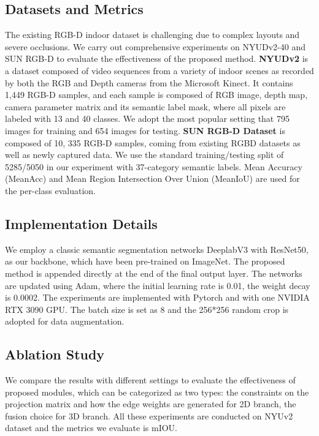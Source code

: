 \documentclass[journal]{IEEEtran}
\begin{document}
\subsection{Datasets and Metrics}  
    The existing RGB-D indoor dataset is challenging due to complex layouts and severe occlusions. We carry out comprehensive experiments on NYUDv2-40  \cite{silberman2012indoor} and SUN RGB-D \cite{song2015sun} to evaluate the effectiveness of the proposed method. \textbf{NYUDv2} is a dataset composed of video sequences from a variety of indoor scenes as recorded by both the RGB and Depth cameras from the Microsoft Kinect. It contains 1,449 RGB-D samples, and each sample is composed of RGB image, depth map, camera parameter matrix and its semantic label mask, where all pixels are labeled with 13 and 40 classes. We adopt the most popular setting that 795 images for training and 654 images for testing. \textbf{SUN RGB-D Dataset} is composed of 10, 335 RGB-D samples, coming from existing RGBD datasets \cite{silberman2012indoor} \cite{janoch2013category} \cite{xiao2013sun3d} as well as newly captured data. We use the standard training/testing split \cite{song2015sun} of 5285/5050 in our experiment with 37-category semantic labels. Mean Accuracy (MeanAcc) and Mean Region Intersection Over Union (MeanIoU) are used for the per-class evaluation.  


\subsection{Implementation Details}  
 
    We employ a classic semantic segmentation networks DeeplabV3 with ResNet50, as our backbone, which have been pre-trained on ImageNet. The proposed method is appended directly at the end of the final output layer. The networks are updated using Adam, where the initial learning rate is 0.01, the weight decay is 0.0002. The experiments are implemented with Pytorch and with one NVIDIA RTX 3090 GPU. The batch size is set as 8 and the 256*256 random crop is adopted for data augmentation. 

    \subsection{Ablation Study}\label{sec_sub_ablation_study} 
    We compare the results with different settings to evaluate the effectiveness of proposed modules, which can be categorized as two types: the constraints on the projection matrix and how the edge weights are generated for 2D branch, the fusion choice for 3D branch. All these experiments are conducted on NYUv2 dataset and the metrics we evaluate is mIOU. \\
    
\end{document}
